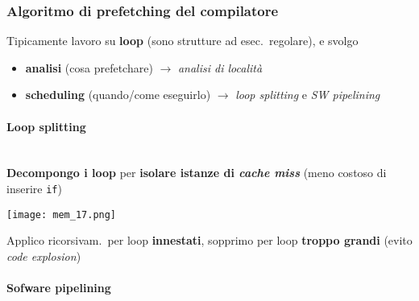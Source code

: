 \subsubsection{Algoritmo di prefetching del compilatore}

Tipicamente lavoro su \textbf{loop} (sono strutture ad esec.~regolare), e svolgo
\begin{itemize}
  \item \textbf{analisi} (cosa prefetchare) $\rightarrow$ \textit{analisi di localit\`a}
  \item \textbf{scheduling} (quando/come eseguirlo) $\rightarrow$ \textit{loop splitting} e \textit{SW pipelining}
\end{itemize}

\paragraph{Loop splitting}~\\

  \textbf{Decompongo i loop} per \textbf{isolare istanze di \textit{cache miss}} (meno costoso di inserire \lstinline|if|)

\begin{center}
  \texttt{[image: mem\_17.png]}
\end{center}

Applico ricorsivam.~per loop \textbf{innestati}, sopprimo per loop \textbf{troppo grandi} (evito \textit{code explosion})

\paragraph{Sofware pipelining}~\\

